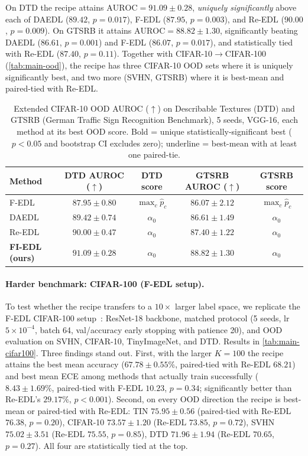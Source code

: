 \documentclass[review,5p,times]{elsarticle}
\begin{document}
On DTD the recipe attains $\mathrm{AUROC}\!=\!91.09\!\pm\!0.28$,
\emph{uniquely significantly} above each of DAEDL ($89.42$,
$p\!=\!0.017$), F-EDL ($87.95$, $p\!=\!0.003$), and Re-EDL ($90.00$,
$p\!=\!0.009$). On GTSRB it attains $\mathrm{AUROC}\!=\!88.82\!\pm\!1.30$,
significantly beating DAEDL ($86.61$, $p\!=\!0.001$) and F-EDL
($86.07$, $p\!=\!0.017$), and statistically tied with Re-EDL
($87.40$, $p\!=\!0.11$). Together with CIFAR-10$\to$CIFAR-100
(\autoref{tab:main-ood}), the recipe has three CIFAR-10 OOD sets where
it is uniquely significantly best, and two more (SVHN, GTSRB) where it
is best-mean and paired-tied with Re-EDL.

\begin{table}[t]
  \centering
  \caption{Extended CIFAR-10 OOD AUROC ($\uparrow$) on Describable
    Textures (DTD) and GTSRB (German Traffic Sign Recognition
    Benchmark), 5 seeds, VGG-16, each method at its best OOD score.
    Bold = unique statistically-significant best ($p\!<\!0.05$ and
    bootstrap CI excludes zero); underline = best-mean with at least
    one paired-tie.}
  \label{tab:main-extended-ood}
  \small
  \begin{tabular}{lcccc}
    \toprule
    Method & DTD AUROC ($\uparrow$) & DTD score & GTSRB AUROC ($\uparrow$) & GTSRB score \\
    \midrule
    F-EDL  & $87.95 \pm 0.80$ & $\max_c\hat p_c$ & $86.07 \pm 2.12$ & $\max_c\hat p_c$ \\
    DAEDL  & $89.42 \pm 0.74$ & $\alpha_0$ & $86.61 \pm 1.49$ & $\alpha_0$ \\
    Re-EDL & $90.00 \pm 0.47$ & $\alpha_0$ & $87.40 \pm 1.22$ & $\alpha_0$ \\
    \textbf{FI-EDL (ours)} & $\mathbf{91.09 \pm 0.28}$ & $\alpha_0$ & \underline{$88.82 \pm 1.30$} & $\alpha_0$ \\
    \bottomrule
  \end{tabular}
\end{table}

\paragraph{Harder benchmark: CIFAR-100 (F-EDL setup).}
To test whether the recipe transfers to a $10\times$ larger label space,
we replicate the F-EDL CIFAR-100 setup~\citep{yoon2025fedl}: ResNet-18
backbone, matched protocol (5 seeds, lr $5\!\times\!10^{-4}$, batch 64,
val/accuracy early stopping with patience 20), and OOD evaluation on
SVHN, CIFAR-10, TinyImageNet, and DTD. Results in
\autoref{tab:main-cifar100}. Three findings stand out. First, with the
larger $K\!=\!100$ the recipe attains the best mean accuracy
($67.78\!\pm\!0.55\%$, paired-tied with Re-EDL $68.21$) and best mean
ECE among methods that actually train successfully ($8.43\!\pm\!1.69\%$,
paired-tied with F-EDL $10.23$, $p\!=\!0.34$; significantly better than
Re-EDL's $29.17\%$, $p\!<\!0.001$). Second, on every OOD direction the
recipe is best-mean or paired-tied with Re-EDL: TIN
$75.95\!\pm\!0.56$ (paired-tied with Re-EDL $76.38$, $p\!=\!0.20$),
CIFAR-10 $73.57\!\pm\!1.20$ (Re-EDL $73.85$, $p\!=\!0.72$), SVHN
$75.02\!\pm\!3.51$ (Re-EDL $75.55$, $p\!=\!0.85$), DTD
$71.96\!\pm\!1.94$ (Re-EDL $70.65$, $p\!=\!0.27$). All four are
statistically tied at the top.
\end{document}
